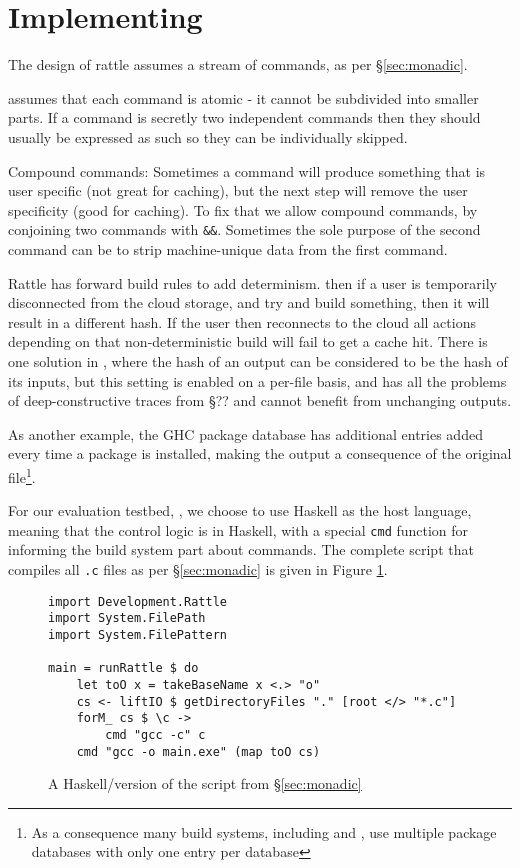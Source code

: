 \section{Implementing \Rattle}
\label{sec:implementation}

The design of rattle assumes a stream of commands, as per \S\ref{sec:monadic}.

\Rattle assumes that each command is atomic - it cannot be subdivided into smaller parts. If a command is secretly two independent commands then they should usually be expressed as such so they can be individually skipped.

Compound commands: Sometimes a command will produce something that is user specific (not great for caching), but the next step will remove the user specificity (good for caching). To fix that we allow compound commands, by conjoining two commands with \texttt{\&\&}. Sometimes the sole purpose of the second command can be to strip machine-unique data from the first command.

Rattle has forward build rules to add determinism. then if a user is temporarily disconnected from the cloud storage, and try and build something, then it will result in a different hash. If the user then reconnects to the cloud all actions depending on that non-deterministic build will fail to get a cache hit. There is one solution in \Rattle, where the hash of an output can be considered to be the hash of its inputs, but this setting is enabled on a per-file basis, and has all the problems of deep-constructive traces from \cite{build_systems_a_la_carte} \S?? and cannot benefit from unchanging outputs.


As another example, the GHC package database has additional entries added every time a package is installed, making the output a consequence of the original file\footnote{As a consequence many build systems, including \Bazel and \Rattle, use multiple package databases with only one entry per database}.

For our evaluation testbed, \Rattle, we choose to use Haskell as the host language, meaning that the control logic is in Haskell, with a special \texttt{cmd} function for informing the build system part about commands. The complete \Rattle script that compiles all \texttt{.c} files as per \S\ref{sec:monadic} is given in Figure \ref{fig:monadic}.

\begin{figure}
\begin{verbatim}
import Development.Rattle
import System.FilePath
import System.FilePattern

main = runRattle $ do
    let toO x = takeBaseName x <.> "o"
    cs <- liftIO $ getDirectoryFiles "." [root </> "*.c"]
    forM_ cs $ \c ->
        cmd "gcc -c" c
    cmd "gcc -o main.exe" (map toO cs)
\end{verbatim}
\caption{A Haskell/\Rattle version of the script from \S\ref{sec:monadic}}
\label{fig:monadic}
\end{figure}

